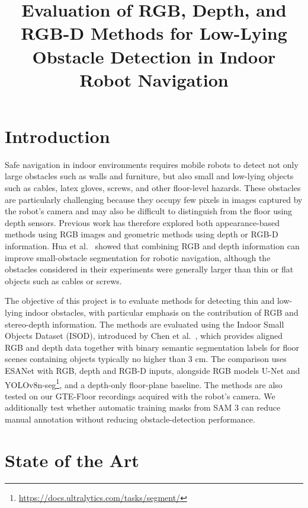 \documentclass[conference]{IEEEtran}
\begin{document}
\title{Evaluation of RGB, Depth, and RGB-D Methods for Low-Lying
Obstacle Detection in Indoor Robot Navigation}
\author{\and {}}
\maketitle
\raggedbottom

\section{Introduction}\label{i.-introduction}

Safe navigation in indoor environments requires mobile robots to detect
not only large obstacles such as walls and furniture, but also small and
low-lying objects such as cables, latex gloves, screws, and other
floor-level hazards. These obstacles are particularly challenging
because they occupy few pixels in images captured by the robot's camera
and may also be difficult to distinguish from the floor using depth
sensors. Previous work has therefore explored both appearance-based
methods using RGB images and geometric methods using depth or RGB-D
information. Hua et al.~\cite{hua2019small} showed that combining RGB
and depth information can improve small-obstacle segmentation for
robotic navigation, although the obstacles considered in their
experiments were generally larger than thin or flat objects such as
cables or screws.

The objective of this project is to evaluate methods for detecting thin
and low-lying indoor obstacles, with particular emphasis on the
contribution of RGB and stereo-depth information. The methods are
evaluated using the Indoor Small Objects Dataset (ISOD), introduced by
Chen et al.~\cite{chen2023self}, which provides aligned RGB and depth
data together with binary semantic segmentation labels for floor scenes
containing objects typically no higher than 3 cm. The comparison uses
ESANet \cite{seichter2021efficient} with RGB, depth and RGB-D inputs,
alongside RGB models U-Net \cite{ronneberger2015u} and
YOLOv8n-seg\footnote{\url{https://docs.ultralytics.com/tasks/segment/}},
and a depth-only floor-plane baseline. The methods are also tested on
our GTE-Floor recordings acquired with the robot's camera. We
additionally test whether automatic training masks from SAM 3
\cite{carion2026sam} can reduce manual annotation without reducing
obstacle-detection performance.

\section{State of the Art}\label{ii.-state-of-the-art}
\end{document}
